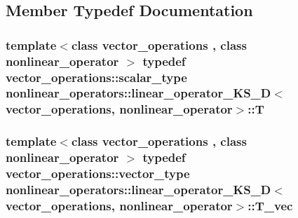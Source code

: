 \subsection{Member Typedef Documentation}
\hypertarget{classnonlinear__operators_1_1linear__operator__KS__2D_ab5ed31d39991f15dc88ef56cd373c84d}{
\subsubsection[{T}]{\setlength{\rightskip}{0pt plus 5cm}template$<$class vector\-\_\-operations , class nonlinear\-\_\-operator $>$ typedef {\bf vector\-\_\-operations\-::scalar\-\_\-type} {\bf nonlinear\-\_\-operators\-::linear\-\_\-operator\-\_\-\-K\-S\-\_\-D}$<$ {\bf vector\-\_\-operations}, nonlinear\-\_\-operator$>$\-::{\bf T}}}\label{classnonlinear__operators_1_1linear__operator__KS__2D_ab5ed31d39991f15dc88ef56cd373c84d}
\hypertarget{classnonlinear__operators_1_1linear__operator__KS__2D_af68ec3eba6ca7f10f49f64b20a7259a1}{
\subsubsection[{T\-\_\-vec}]{\setlength{\rightskip}{0pt plus 5cm}template$<$class vector\-\_\-operations , class nonlinear\-\_\-operator $>$ typedef {\bf vector\-\_\-operations\-::vector\-\_\-type} {\bf nonlinear\-\_\-operators\-::linear\-\_\-operator\-\_\-\-K\-S\-\_\-D}$<$ {\bf vector\-\_\-operations}, nonlinear\-\_\-operator$>$\-::{\bf T\-\_\-vec}}}\label{classnonlinear__operators_1_1linear__operator__KS__2D_af68ec3eba6ca7f10f49f64b20a7259a1}


